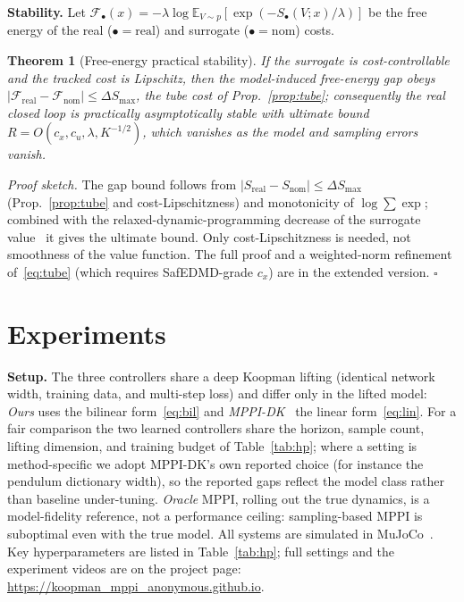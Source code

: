 \documentclass[lettersize,journal]{IEEEtran}
\newtheorem{theorem}{Theorem}
\theoremstyle{remark}
\begin{document}
\textbf{Stability.}
Let $\mathcal F_\bullet(x)=-\lambda\log\mathbb E_{V\sim p}[\exp(-S_\bullet(V;x)/\lambda)]$ be the free energy of the real ($\bullet{=}\mathrm{real}$) and surrogate ($\bullet{=}\mathrm{nom}$) costs.
\begin{theorem}[Free-energy practical stability]\label{thm:stab}
If the surrogate is cost-controllable and the tracked cost is Lipschitz, then the model-induced free-energy gap obeys $|\mathcal F_{\mathrm{real}}-\mathcal F_{\mathrm{nom}}|\le\Delta S_{\max}$, the tube cost of Prop.~\ref{prop:tube}; consequently the real closed loop is practically asymptotically stable with ultimate bound $R=O(c_x,c_u,\lambda,K^{-1/2})$, which vanishes as the model and sampling errors vanish.
\end{theorem}
\noindent\emph{Proof sketch.}
The gap bound follows from $|S_{\mathrm{real}}-S_{\mathrm{nom}}|\le\Delta S_{\max}$ (Prop.~\ref{prop:tube} and cost-Lipschitzness) and monotonicity of $\log\sum\exp$; combined with the relaxed-dynamic-programming decrease of the surrogate value~\cite{strasser2026,korda2018mpc} it gives the ultimate bound.
Only cost-Lipschitzness is needed, not smoothness of the value function.
The full proof and a weighted-norm refinement of~\eqref{eq:tube} (which requires SafEDMD-grade $c_x$) are in the extended version. \hfill$\square$

\section{Experiments}\label{sec:exp}
\textbf{Setup.}
The three controllers share a deep Koopman lifting (identical network width, training data, and multi-step loss) and differ only in the lifted model: \emph{Ours} uses the bilinear form~\eqref{eq:bil} and \emph{MPPI-DK}~\cite{mppidk2026} the linear form~\eqref{eq:lin}.
For a fair comparison the two learned controllers share the horizon, sample count, lifting dimension, and training budget of Table~\ref{tab:hp}; where a setting is method-specific we adopt MPPI-DK's own reported choice (for instance the pendulum dictionary width), so the reported gaps reflect the model class rather than baseline under-tuning.
\emph{Oracle} MPPI, rolling out the true dynamics, is a model-fidelity reference, not a performance ceiling: sampling-based MPPI is suboptimal even with the true model.
All systems are simulated in MuJoCo~\cite{mujoco2012}.
Key hyperparameters are listed in Table~\ref{tab:hp}; full settings and the experiment videos are on the project page: \url{https://koopman_mppi_anonymous.github.io}.
\end{document}
